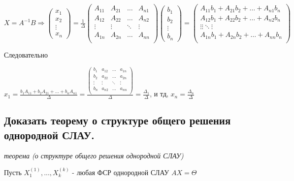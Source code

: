 $X = A^{-1}B \Rightarrow \begin{pmatrix}x_1\\x_2\\\vdots\\x_n\end{pmatrix} = \frac{1}{\Delta}
\begin{pmatrix}
    A_{11}&A_{21}&\ldots&A_{n1}\\
    A_{12}&A_{22}&\ldots&A_{n2}\\
    \vdots&\vdots&\ddots&\vdots\\
    A_{1n}&A_{2n}&\ldots&A_{nn}\\
\end{pmatrix}
\begin{pmatrix}b_1\\b_2\\\vdots\\b_n\end{pmatrix}
=
\begin{pmatrix}
    A_{11}b_1 + A_{21}b_2 + \ldots + A_{n1}b_n\\
    A_{12}b_1 + A_{22}b_2 + \ldots + A_{n2}b_n\\
    \vdots\vdots\ddots\vdots\\
    A_{1n}b_1 + A_{2n}b_2 + \ldots + A_{nn}b_n\\
\end{pmatrix}
$

Следовательно

$
x_1 = \frac{b_1A_{11}+b_2A_{21}+...+b_nA_{n1}}{\Delta}
=\frac{
\begin{pmatrix}
b_1&a_{12}&\ldots&a_{1n}\\
b_2&a_{22}&\ldots&a_{2n}\\
\vdots&\vdots&\ddots&\vdots\\
b_n&a_{n2}&\ldots&a_{nn}\\\end{pmatrix}}{\Delta}=
\frac{\Delta_1}{\Delta}
$, и тд, $x_n = \frac{\Delta_n}{\Delta}$

\ep 

\subsection{Доказать теорему о структуре общего решения однородной СЛАУ.}

\textit {теорема (о структуре общего решения однородной СЛАУ)}

\vspace*{15pt}

Пусть $X_1^{(1)}, ..., X_k^{(k)}$ - любая ФСР однородной СЛАУ $AX = \Theta$

